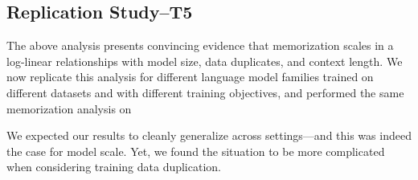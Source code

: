 \subsection{Replication Study--T5}

The above analysis presents convincing evidence that memorization scales in a log-linear relationships with model size, data duplicates, and context length.
%
We now replicate this analysis for different language model families trained on different datasets
and with different training objectives, and performed the same memorization analysis on

%
We expected our results to cleanly generalize across settings---and this was indeed the case for model scale. Yet, we found the situation to be more complicated when considering training data duplication.


